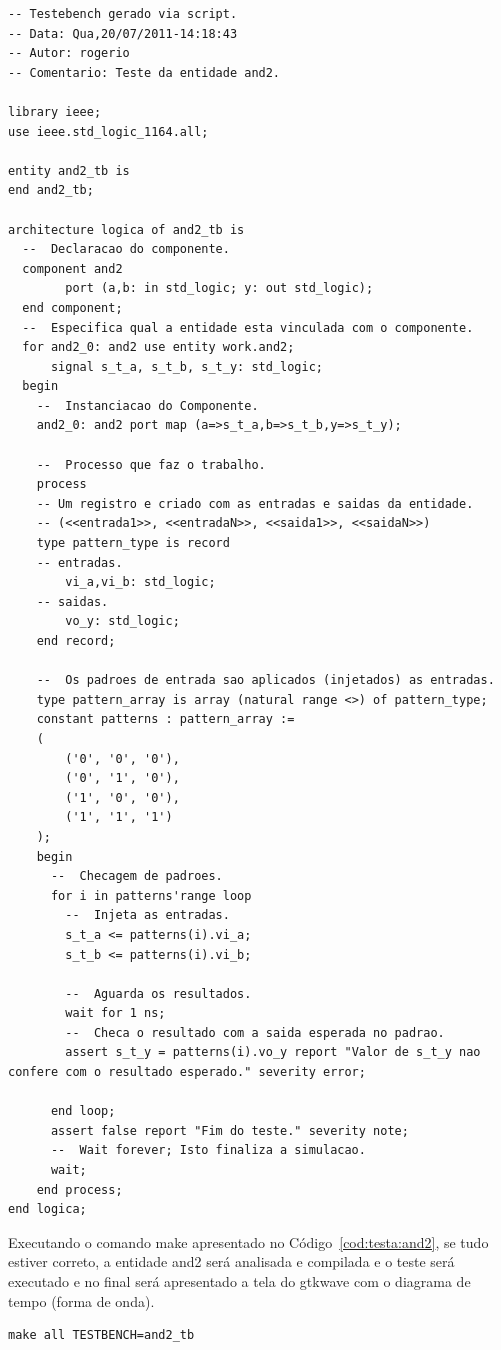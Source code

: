 \documentclass[a4paper,10pt]{report}
\begin{document}
\lstset{language=VHDL}
\lstset{numbers=left, numberstyle=\tiny, stepnumber=1, numbersep=3pt}
\begin{lstlisting}[label=cod:and2_tb,caption=Código VHDL do testebench para entidade and2]
-- Testebench gerado via script.
-- Data: Qua,20/07/2011-14:18:43
-- Autor: rogerio
-- Comentario: Teste da entidade and2.

library ieee;
use ieee.std_logic_1164.all;

entity and2_tb is
end and2_tb;

architecture logica of and2_tb is
  --  Declaracao do componente.
  component and2
    	port (a,b: in std_logic; y: out std_logic);
  end component;
  --  Especifica qual a entidade esta vinculada com o componente.
  for and2_0: and2 use entity work.and2;
      signal s_t_a, s_t_b, s_t_y: std_logic;
  begin
    --  Instanciacao do Componente.
    and2_0: and2 port map (a=>s_t_a,b=>s_t_b,y=>s_t_y);

    --  Processo que faz o trabalho.
    process
	-- Um registro e criado com as entradas e saidas da entidade.
	-- (<<entrada1>>, <<entradaN>>, <<saida1>>, <<saidaN>>)
	type pattern_type is record
	-- entradas.
		vi_a,vi_b: std_logic;
	-- saidas.
		vo_y: std_logic;
	end record;

	--  Os padroes de entrada sao aplicados (injetados) as entradas.
	type pattern_array is array (natural range <>) of pattern_type;
	constant patterns : pattern_array :=
	(
		('0', '0', '0'),
		('0', '1', '0'),
		('1', '0', '0'),
		('1', '1', '1')						
	);
	begin
	  --  Checagem de padroes.
	  for i in patterns'range loop
	    --  Injeta as entradas.
		s_t_a <= patterns(i).vi_a;
		s_t_b <= patterns(i).vi_b;
				
		--  Aguarda os resultados.
		wait for 1 ns;
		--  Checa o resultado com a saida esperada no padrao.
		assert s_t_y = patterns(i).vo_y	report "Valor de s_t_y nao confere com o resultado esperado." severity error;
						
	  end loop;
	  assert false report "Fim do teste." severity note;
	  --  Wait forever; Isto finaliza a simulacao.
	  wait;
	end process;
end logica;
\end{lstlisting}

Executando o comando make apresentado no Código~\ref{cod:testa:and2}, se tudo estiver correto, a entidade and2 será analisada e compilada e o teste será executado e no final será apresentado a tela do gtkwave com o diagrama de tempo (forma de onda).

\lstset{numbers=left, numberstyle=\tiny, stepnumber=1, numbersep=3pt}
\begin{lstlisting}[label=cod:testa:and2,caption=Comando para executar o testbench da entidade and2.]
  make all TESTBENCH=and2_tb
\end{lstlisting}
\end{document}
